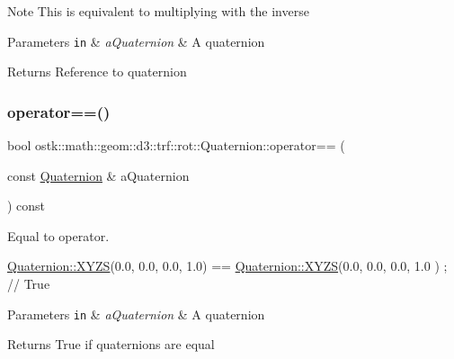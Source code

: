 \begin{DoxyNote}{Note}
This is equivalent to multiplying with the inverse
\end{DoxyNote}

\begin{DoxyParams}[1]{Parameters}
\mbox{\tt in}  & {\em a\+Quaternion} & A quaternion \\
\hline
\end{DoxyParams}
\begin{DoxyReturn}{Returns}
Reference to quaternion 
\end{DoxyReturn}
\mbox{\label{classostk_1_1math_1_1geom_1_1d3_1_1trf_1_1rot_1_1_quaternion_ae95e1de89cdc0cb22ef4c3e3b1330279}} 
\subsubsection{\texorpdfstring{operator==()}{operator==()}}
{\footnotesize\ttfamily bool ostk\+::math\+::geom\+::d3\+::trf\+::rot\+::\+Quaternion\+::operator== (\begin{DoxyParamCaption}\item[{const \hyperlink{classostk_1_1math_1_1geom_1_1d3_1_1trf_1_1rot_1_1_quaternion}{Quaternion} \&}]{a\+Quaternion }\end{DoxyParamCaption}) const}



Equal to operator. 


\begin{DoxyCode}
\hyperlink{classostk_1_1math_1_1geom_1_1d3_1_1trf_1_1rot_1_1_quaternion_ac57ea57a4033622ed1389101b2e58c76}{Quaternion::XYZS}(0.0, 0.0, 0.0, 1.0) == \hyperlink{classostk_1_1math_1_1geom_1_1d3_1_1trf_1_1rot_1_1_quaternion_ac57ea57a4033622ed1389101b2e58c76}{Quaternion::XYZS}(0.0, 0.0, 0.0, 1.0
      ) ; \textcolor{comment}{// True}
\end{DoxyCode}



\begin{DoxyParams}[1]{Parameters}
\mbox{\tt in}  & {\em a\+Quaternion} & A quaternion \\
\hline
\end{DoxyParams}
\begin{DoxyReturn}{Returns}
True if quaternions are equal 
\end{DoxyReturn}
\mbox{\label{classostk_1_1math_1_1geom_1_1d3_1_1trf_1_1rot_1_1_quaternion_a2abd034d5bf5536ffef005c99ff6221e}} 
